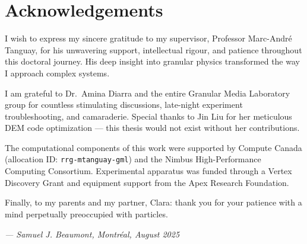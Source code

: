 \chapter*{Acknowledgements}

I wish to express my sincere gratitude to my supervisor, Professor Marc-Andr\'e Tanguay, for his unwavering support, intellectual rigour, and patience throughout this doctoral journey. His deep insight into granular physics transformed the way I approach complex systems.

I am grateful to Dr.\ Amina Diarra and the entire Granular Media Laboratory group for countless stimulating discussions, late-night experiment troubleshooting, and camaraderie. Special thanks to Jin Liu for her meticulous DEM code optimization --- this thesis would not exist without her contributions.

The computational components of this work were supported by Compute Canada (allocation ID: \texttt{rrg-mtanguay-gml}) and the Nimbus High-Performance Computing Consortium. Experimental apparatus was funded through a Vertex Discovery Grant and equipment support from the Apex Research Foundation.

Finally, to my parents and my partner, Clara: thank you for your patience with a mind perpetually preoccupied with particles.

\vspace{16pt}
\begin{flushright}
\textit{--- Samuel J. Beaumont, Montr\'eal, August 2025}
\end{flushright}

\newpage

\tableofcontents
{}

\listoffigures
{}

\listoftables
{}

\newpage

